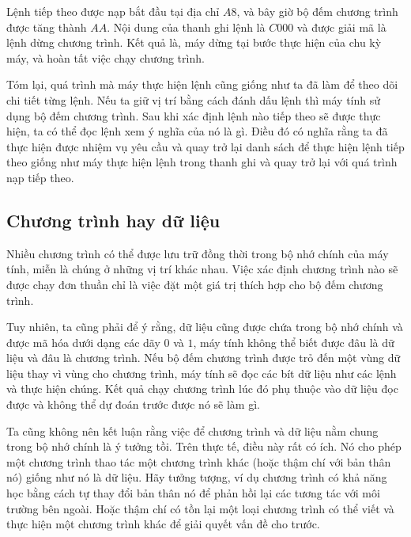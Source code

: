 Lệnh tiếp theo được nạp bắt đầu tại địa chỉ $A8$, và bây giờ bộ đếm chương trình được tăng
thành $AA$. Nội dung của thanh ghi lệnh là $C000$ và được giải mã là lệnh dừng chương
trình. Kết quả là, máy dừng tại bước thực hiện của chu kỳ máy, và hoàn tất việc chạy
chương trình.

Tóm lại, quá trình mà máy thực hiện lệnh cũng giống như ta đã làm để theo dõi chi
tiết từng lệnh. Nếu ta giữ vị trí bằng cách đánh dấu lệnh thì máy tính sử dụng bộ
đếm chương trình. Sau khi xác định lệnh nào tiếp theo sẽ được thực hiện, ta có thể
đọc lệnh xem ý nghĩa của nó là gì. Điều đó có nghĩa rằng ta đã thực hiện được nhiệm
vụ yêu cầu và quay trở lại danh sách để thực hiện lệnh tiếp theo giống như máy thực hiện
lệnh trong thanh ghi và quay trở lại với quá trình nạp tiếp theo.

\subsection*{Chương trình hay dữ liệu}
Nhiều chương trình có thể được lưu trữ đồng thời trong bộ nhớ chính của máy tính, miễn là
chúng ở những vị trí khác nhau. Việc xác định chương trình nào sẽ được chạy đơn thuần chỉ
là việc đặt một giá trị thích hợp cho bộ đếm chương trình.

Tuy nhiên, ta cũng phải để ý rằng, dữ liệu cũng được chứa trong bộ nhớ chính và được
mã hóa dưới dạng các dãy $0$ và $1$, máy tính không thể biết được đâu là dữ liệu và đâu là
chương trình. Nếu bộ đếm chương trình được trỏ đến một vùng dữ liệu thay vì vùng cho
chương trình, máy tính sẽ đọc các bít dữ liệu như các lệnh và thực hiện chúng. Kết quả
chạy chương trình lúc đó phụ thuộc vào dữ liệu đọc được và không thể dự đoán trước được nó
sẽ làm gì.

Ta cũng không nên kết luận rằng việc để chương trình và dữ liệu nằm chung trong bộ nhớ
chính là ý tưởng tồi. Trên thực tế, điều này rất có ích. Nó cho phép một chương trình thao
tác một chương trình khác (hoặc thậm chí với bản thân nó) giống như nó là dữ liệu. Hãy
tưởng tượng, ví dụ chương trình có khả năng học bằng cách tự thay đổi bản thân nó để phản
hồi lại các tương tác với môi trường bên ngoài. Hoặc thậm chí có tồn lại một loại chương
trình có thể viết và thực hiện một chương trình khác để giải quyết vấn đề cho trước.

